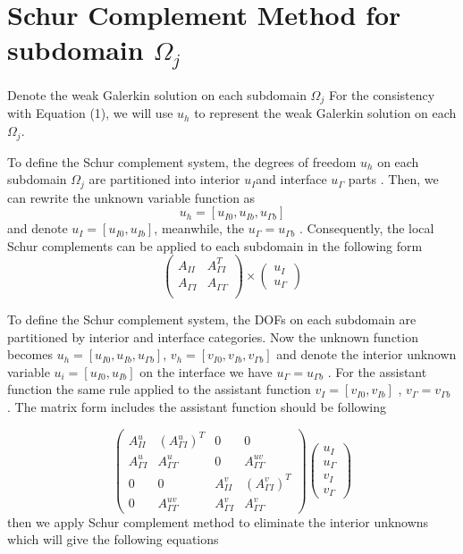 \section{Schur Complement Method for subdomain $ \Omega_{j} $}

Denote the weak Galerkin solution on each subdomain $ \Omega_{j} $  For the consistency with Equation (1), we will use $ u_{h} $  to represent the weak Galerkin solution on each $ \Omega_{j} $.

To define the Schur complement system, the degrees of freedom $ u_h $  on each subdomain $ \Omega_j $ are partitioned into interior  $ u_{I}  $and interface $ u_{\Gamma} $ parts . Then, we can rewrite the unknown variable function as 
\begin{equation}
u_{h} = [u_{I0}, u_{Ib}, u_{\Gamma b}]
\end{equation}
and denote  $ u_I =  [u_{I0}, u_{Ib}]$, meanwhile, the $ u_{\Gamma} = u_{\Gamma b} $ . Consequently, the local Schur complements can be applied to each subdomain  in the following form
\begin{equation}
\begin{pmatrix}
A_{II} & A_{\Gamma I}^{T} \\
A_{\Gamma I} & A_{\Gamma \Gamma} \\
\end{pmatrix} \times
\begin{pmatrix}
u_{I} \\ u_{\Gamma}
\end{pmatrix}
\end{equation}

To define the Schur complement system, the DOFs on each subdomain are partitioned by interior and interface categories. Now the unknown function becomes $ u_{h} = [u_{I0}, u_{Ib}, u_{\Gamma b}] $, $ v_{h} = [v_{I0}, v_{Ib}, v_{\Gamma b}] $ and denote the interior unknown variable $ u_{i} = [u_{I0}, u_{Ib}] $ on the interface we have $ u_{\Gamma} = u_{\Gamma b} $ . For the assistant function the same rule applied to the assistant function $ v_I = [v_{I0}, v_{Ib}] $ , $ v_{\Gamma} = v_{\Gamma b} $ . The matrix form includes the assistant function should be following

\begin{equation}
\begin{pmatrix}
A_{II}^{u} & (A_{\Gamma I}^{u})^{T} & 0 & 0 \\
A_{\Gamma I}^{u} & A_{\Gamma \Gamma}^{u} & 0 & A_{\Gamma \Gamma}^{uv} \\
0 & 0 & A_{II}^{v} & (A_{\Gamma I}^{v})^{T} \\
0 & A_{\Gamma \Gamma}^{uv} & A_{\Gamma I}^{v} & A_{\Gamma \Gamma}^{v} 
\end{pmatrix} 
\begin{pmatrix}
u_{I} \\ u_{\Gamma} \\ v_{I} \\ v_{\Gamma}
\end{pmatrix}
\end{equation}
then we apply Schur complement method to eliminate the interior unknowns which will give the following equations

